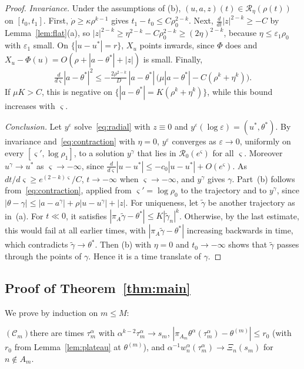\documentclass[11pt]{article}
\theoremstyle{definition}
\theoremstyle{remark}
\newcommand{\cR}{\mathcal{R}}
\newcommand{\eps}{\varepsilon}
\begin{document}
\begin{proof}
\emph{Invariance.} Under the assumptions of (b), $(u,a,z)(t)\in\cR_\eta(\rho(t))$ on $[t_0,t_1]$. First, $\dot\rho\ge\kappa\rho^{k-1}$ gives $t_1-t_0\le C\rho_0^{2-k}$. Next, $\frac{d}{dt}|z|^{2-k}\ge-C$ by Lemma~\ref{lem:flat}(a), so $|z|^{2-k}\ge\eta^{2-k}-C\rho_0^{2-k}\ge(2\eta)^{2-k}$, because $\eta\le\eps_1\rho_0$ with $\eps_1$ small. On $\{|u-u^*|=r\}$, $X_u$ points inwards, since $\Phi$ does and $X_u-\Phi(u)=O(\rho+|a-\theta^*|+|z|)$ is small. Finally,
\[
\tfrac{d}{d\varsigma}|a-\theta^*|^2\le-\tfrac{2\rho^{2-k}}{D}\,|a-\theta^*|\,\big(\mu|a-\theta^*|-C(\rho^k+\eta^k)\big).
\]
If $\mu K>C$, this is negative on $\{|a-\theta^*|=K(\rho^k+\eta^k)\}$, while this bound increases with $\varsigma$.

\emph{Conclusion.} Let $y^\eps$ solve~\eqref{eq:radial} with $z\equiv0$ and $y^\eps(\log\eps)=(u^*,\theta^*)$. By invariance and~\eqref{eq:contraction} with $\eta=0$, $y^\eps$ converges as $\eps\to0$, uniformly on every $[\varsigma',\log\rho_1]$, to a solution $y^\gamma$ that lies in $\cR_0(e^\varsigma)$ for all $\varsigma$. Moreover $u^\gamma\to u^*$ as $\varsigma\to-\infty$, since $\frac{d}{d\varsigma}|u-u^*|\le-c_0|u-u^*|+O(e^\varsigma)$. As $dt/d\varsigma\ge e^{(2-k)\varsigma}/C$, $t\to-\infty$ when $\varsigma\to-\infty$, and $y^\gamma$ gives $\gamma$. Part~(b) follows from~\eqref{eq:contraction}, applied from $\varsigma'=\log\rho_0$ to the trajectory and to $y^\gamma$, since $|\theta-\gamma|\le|a-a^\gamma|+\rho|u-u^\gamma|+|z|$. For uniqueness, let $\tilde\gamma$ be another trajectory as in~(a). For $t\ll0$, it satisfies $|\pi_A\tilde\gamma-\theta^*|\le K|\tilde\gamma_n|^k$. Otherwise, by the last estimate, this would fail at all earlier times, with $|\pi_A\tilde\gamma-\theta^*|$ increasing backwards in time, which contradicts $\tilde\gamma\to\theta^*$. Then (b) with $\eta=0$ and $t_0\to-\infty$ shows that $\tilde\gamma$ passes through the points of $\gamma$. Hence it is a time translate of $\gamma$.
\end{proof}

\subsection*{Proof of Theorem~\ref{thm:main}}

We prove by induction on $m\le M$:

\smallskip\noindent$(\mathcal C_m)$\quad there are times $\tau^\alpha_m$ with $\alpha^{k-2}\tau^\alpha_m\to s_m$, $|\pi_{A_m}\theta^\alpha(\tau^\alpha_m)-\theta^{(m)}|\le r_0$ (with $r_0$ from Lemma~\ref{lem:plateau} at $\theta^{(m)}$), and $\alpha^{-1}w^\alpha_n(\tau^\alpha_m)\to\Xi_n(s_m)$ for $n\notin A_m$.
\end{document}
